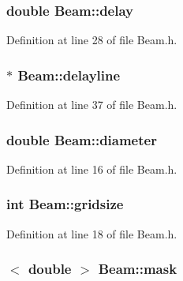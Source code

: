 \hypertarget{classBeam_affa1c91c24f15b6acbaae1682b19d9a7}{
\subsubsection[{delay}]{\setlength{\rightskip}{0pt plus 5cm}double {\bf Beam::delay}}}
\label{classBeam_affa1c91c24f15b6acbaae1682b19d9a7}


Definition at line 28 of file Beam.h.

\hypertarget{classBeam_abb779dd249b5a26502a49106aa8023a4}{
\subsubsection[{delayline}]{$\ast$ {\bf Beam::delayline}}}
\label{classBeam_abb779dd249b5a26502a49106aa8023a4}


Definition at line 37 of file Beam.h.

\hypertarget{classBeam_a5b8823412936aee5a88bc657e0ed546c}{
\subsubsection[{diameter}]{\setlength{\rightskip}{0pt plus 5cm}double {\bf Beam::diameter}}}
\label{classBeam_a5b8823412936aee5a88bc657e0ed546c}


Definition at line 16 of file Beam.h.

\hypertarget{classBeam_a1c813015bb33a0565e1ee3ea0d570e11}{
\subsubsection[{gridsize}]{\setlength{\rightskip}{0pt plus 5cm}int {\bf Beam::gridsize}}}
\label{classBeam_a1c813015bb33a0565e1ee3ea0d570e11}


Definition at line 18 of file Beam.h.

\hypertarget{classBeam_af1dc67711c28c260a813088d4afb14e9}{
\subsubsection[{mask}]{$<$ double $>$ {\bf Beam::mask}}}
\label{classBeam_af1dc67711c28c260a813088d4afb14e9}


